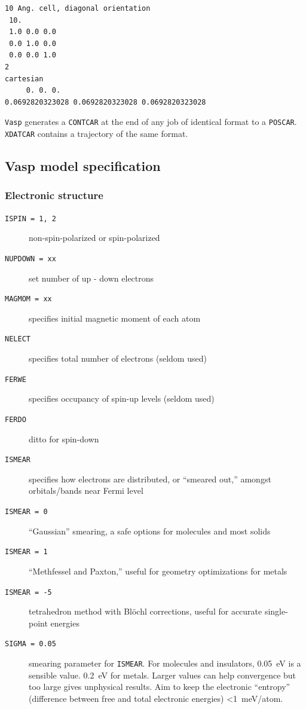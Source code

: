 \documentclass[11pt]{article}
\begin{document}
\begin{verbatim}
10 Ang. cell, diagonal orientation
 10.
 1.0 0.0 0.0
 0.0 1.0 0.0
 0.0 0.0 1.0
2
cartesian
     0. 0. 0.
0.0692820323028 0.0692820323028 0.0692820323028  
\end{verbatim}

\texttt{Vasp} generates a \texttt{CONTCAR} at the end of any job of identical format to a \texttt{POSCAR}. \texttt{XDATCAR} contains a trajectory of the same format.
\subsection{Vasp model specification}
\label{sec:org1d22569}
\subsubsection{Electronic structure}
\label{sec:orge6be3a2}
\begin{description}
\item[{\texttt{ISPIN = 1, 2}}] non-spin-polarized or spin-polarized
\item[{\texttt{NUPDOWN = xx}}] set number of up - down electrons
\item[{\texttt{MAGMOM = xx}}] specifies initial magnetic moment of each atom
\item[{\texttt{NELECT}}] specifies total number of electrons (seldom used)
\item[{\texttt{FERWE}}] specifies occupancy of spin-up levels (seldom used)
\item[{\texttt{FERDO}}] ditto for spin-down
\item[{\texttt{ISMEAR}}] specifies how electrons are distributed, or ``smeared out,'' amongst orbitals/bands near Fermi level
\item[{\texttt{ISMEAR = 0}}] ``Gaussian'' smearing, a safe options for molecules and most solids
\item[{\texttt{ISMEAR = 1}}] ``Methfessel and Paxton,'' useful for geometry optimizations for metals
\item[{\texttt{ISMEAR = -5}}] tetrahedron method with Bl\"{o}chl corrections, useful for accurate single-point energies
\item[{\texttt{SIGMA = 0.05}}] smearing parameter for \texttt{ISMEAR}.  For molecules and insulators, \SI{0.05}{eV} is a sensible value. \SI{0.2}{eV} for metals. Larger values can help convergence but too large gives unphysical results. Aim to keep the electronic ``entropy'' (difference between free and total electronic energies) \SI{<1}{meV/atom}.
\end{description}
\end{document}
